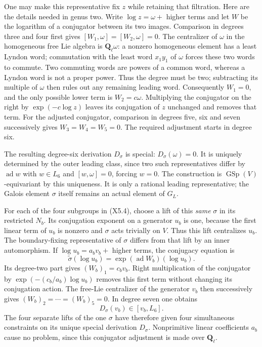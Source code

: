 One may make this representative fix $z$ while retaining
that filtration. Here are the details needed in genus two.
Write $\log z=\omega+$ higher terms and let $W$ be the
logarithm of a conjugator between its two images. Comparison
in degrees three and four first gives
$[W_1,\omega]=[W_2,\omega]=0$. The centralizer
of $\omega$ in the homogeneous free Lie algebra is
$\mathbf Q_\ell\omega$: a nonzero homogeneous element has
a least Lyndon word; commutation with the least word
$x_1y_1$ of $\omega$ forces these two words to commute.
Two commuting words are powers of a common word, whereas
a Lyndon word is not a proper power. Thus the degree must
be two; subtracting its multiple of $\omega$ then rules
out any remaining leading word. Consequently $W_1=0$,
and the only possible lower term is $W_2=c\omega$.
Multiplying the conjugator on the right by
$\exp(-c\log z)$ leaves its conjugation of $z$ unchanged
and removes that term. For the adjusted conjugator,
comparison in degrees five, six and seven successively
gives $W_3=W_4=W_5=0$. The required adjustment starts in degree
six.

The resulting degree-six derivation $D_\sigma$ is special:
$D_\sigma(\omega)=0$. It is uniquely determined by the
outer leading class, since two such representatives differ
by $\operatorname{ad}w$ with $w\in L_6$ and
$[w,\omega]=0$, forcing $w=0$. The construction is
$\operatorname{GSp}(V)$-equivariant by this uniqueness.
It is only a rational leading representative; the Galois
element $\sigma$ itself remains an actual element of $G_L$.

For each of the four subgroups in (X5.4), choose a lift of
this \emph{same} $\sigma$ in its restricted $N_b$. Its
conjugation exponent on a generator $u_b$ is one, because
the first linear term of $u_b$ is nonzero and $\sigma$ acts
trivially on $V$. Thus this lift centralizes $u_b$.
The boundary-fixing representative of $\sigma$ differs
from that lift by an inner automorphism. If
$\log u_b=a_bv_b+$ higher terms, the conjugacy equation is
\[
 \widetilde\sigma(\log u_b)
  =\exp(\operatorname{ad}W_b)(\log u_b).
\]
Its degree-two part gives $(W_b)_1=c_bv_b$. Right
multiplication of the conjugator by
$\exp(-(c_b/a_b)\log u_b)$ removes this first term without
changing its conjugation action. The free-Lie centralizer
of the generator $v_b$ then successively gives
$(W_b)_2=\cdots=(W_b)_5=0$. In degree seven one obtains
\[
 D_\sigma(v_b)\in[v_b,L_6].
 \tag{X5.6}
\]
The four separate lifts of the one $\sigma$ have therefore
given four simultaneous constraints on its unique special
derivation $D_\sigma$. Nonprimitive linear coefficients
$a_b$ cause no problem, since this conjugator adjustment
is made over $\mathbf Q_\ell$.

